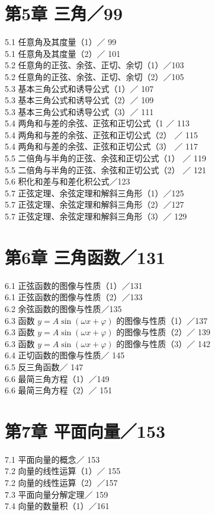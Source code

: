 \documentclass[10pt]{article}
\begin{document}
\section*{第5章 三角／99}
5.1 任意角及其度量（1）／ 99\\
5.1 任意角及其度量（2）／ 101\\
5.2 任意角的正弦、余弦、正切、余切（1）／103\\
5.2 任意角的正弦、余弦、正切、余切（2）／105\\
5.3 基本三角公式和诱导公式（1）／ 107\\
5.3 基本三角公式和诱导公式（2）／ 109\\
5.3 基本三角公式和诱导公式（3）／ 111\\
5.4 两角和与差的余弦、正弦和正切公式（1 ／ 113\\
5.4 两角和与差的余弦、正弦和正切公式（2） ／ 115\\
5.4 两角和与差的余弦、正弦和正切公式（3） ／ 117\\
5.5 二倍角与半角的正弦、余弦和正切公式（1） ／ 119\\
5.5 二倍角与半角的正弦、余弦和正切公式（2） ／ 121\\
5.6 积化和差与和差化积公式／123\\
5.7 正弦定理、余弦定理和解斜三角形（1）／125\\
5.7 正弦定理、余弦定理和解斜三角形（2）／127\\
5.7 正弦定理、余弦定理和解斜三角形（3）／ 129

\section*{第6章 三角函数／131}
6.1 正弦函数的图像与性质（1）／131\\
6.1 正弦函数的图像与性质（2）／133\\
6.2 余弦函数的图像与性质／135\\
6.3 函数 \(y=A \sin (\omega x+\varphi)\) 的图像与性质（1）／137\\
6.3 函数 \(y=A \sin (\omega x+\varphi)\) 的图像与性质（2）／ 139\\
6.3 函数 \(y=A \sin (\omega x+\varphi)\) 的图像与性质（3）／ 142\\
6.4 正切函数的图像与性质／ 145\\
6.5 反三角函数／ 147\\
6.6 最简三角方程（1）／149\\
6.6 最简三角方程（2）／ 151

\section*{第7章 平面向量／153}
7.1 平面向量的概念／ 153\\
7.2 向量的线性运算（1）／ 155\\
7.2 向量的线性运算（2）／157\\
7.3 平面向量分解定理／ 159\\
7.4 向量的数量积（1）／161
\end{document}
